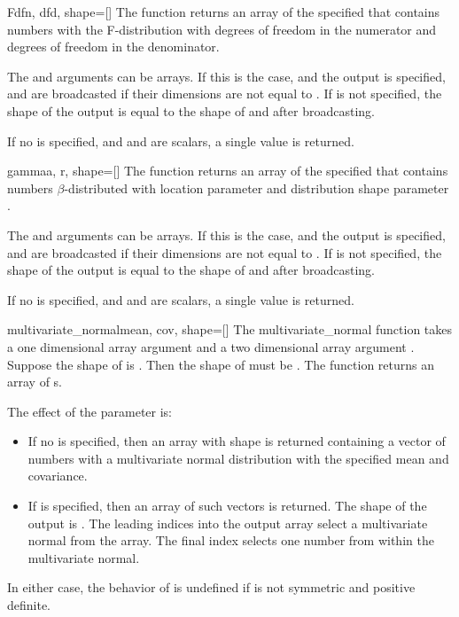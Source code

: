\begin{funcdesc}{F}{dfn, dfd, shape=[]}
  The  function returns an array of the specified  that
  contains  numbers with the F-distribution with  degrees
  of freedom in the numerator and  degrees of freedom in the
  denominator.
   
  The  and  arguments can be arrays. If this is the case, and
  the output  is specified,  and  are broadcasted
  if their dimensions are not equal to . If  is not
  specified, the shape of the output is equal to the shape of  and
   after broadcasting.
   
  If no  is specified, and  and  are scalars, a
  single value is returned.
\end{funcdesc}

\begin{funcdesc}{gamma}{a, r, shape=[]}
   The  function returns an array of the specified 
   that contains  numbers $\beta$-distributed with location
   parameter  and distribution shape parameter .
   
   The  and  arguments can be arrays. If this is the case, and
   the output  is specified,  and  are broadcasted if
   their dimensions are not equal to . If  is not
   specified, the shape of the output is equal to the shape of  and
    after broadcasting.
   
   If no  is specified, and  and  are scalars, a
   single value is returned.
\end{funcdesc}

\begin{funcdesc}{multivariate_normal}{mean, cov, shape=[]}
   The multivariate_normal function takes a one dimensional array argument
    and a two dimensional array argument . Suppose
   the shape of  is . Then the shape of 
   must be . The function returns an array of s.
   
   The effect of the  parameter is:
   \begin{itemize}
   \item If no  is specified, then an array with shape 
      is returned containing a vector of numbers with a multivariate normal
      distribution with the specified mean and covariance.
   \item If  is specified, then an array of such vectors is
      returned.  The shape of the output is . The
      leading indices into the output array select a multivariate normal from
      the array. The final index selects one number from within the
      multivariate normal.
 \end{itemize}
 In either case, the behavior of  is undefined if
  is not symmetric and positive definite.
\end{funcdesc}

